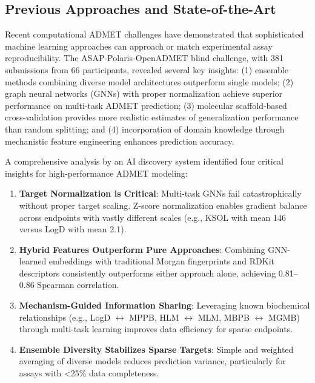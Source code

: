 \documentclass[11pt,a4paper]{article}
\begin{document}
\subsection{Previous Approaches and State-of-the-Art}

Recent computational ADMET challenges have demonstrated that sophisticated machine learning approaches can approach or match experimental assay reproducibility\cite{Macdern2025ASAP}. The ASAP-Polaris-OpenADMET blind challenge, with 381 submissions from 66 participants, revealed several key insights: (1) ensemble methods combining diverse model architectures outperform single models; (2) graph neural networks (GNNs) with proper normalization achieve superior performance on multi-task ADMET prediction; (3) molecular scaffold-based cross-validation provides more realistic estimates of generalization performance than random splitting; and (4) incorporation of domain knowledge through mechanistic feature engineering enhances prediction accuracy\cite{Macdern2025ASAP}.

A comprehensive analysis by an AI discovery system identified four critical insights for high-performance ADMET modeling\cite{kosmos_report}:

\begin{enumerate}
    \item \textbf{Target Normalization is Critical}: Multi-task GNNs fail catastrophically without proper target scaling. Z-score normalization enables gradient balance across endpoints with vastly different scales (e.g., KSOL with mean 146 versus LogD with mean 2.1).

    \item \textbf{Hybrid Features Outperform Pure Approaches}: Combining GNN-learned embeddings with traditional Morgan fingerprints and RDKit descriptors consistently outperforms either approach alone, achieving 0.81--0.86 Spearman correlation.

    \item \textbf{Mechanism-Guided Information Sharing}: Leveraging known biochemical relationships (e.g., LogD $\leftrightarrow$ MPPB, HLM $\leftrightarrow$ MLM, MBPB $\leftrightarrow$ MGMB) through multi-task learning improves data efficiency for sparse endpoints.

    \item \textbf{Ensemble Diversity Stabilizes Sparse Targets}: Simple and weighted averaging of diverse models reduces prediction variance, particularly for assays with <25\% data completeness.
\end{enumerate}
\end{document}
